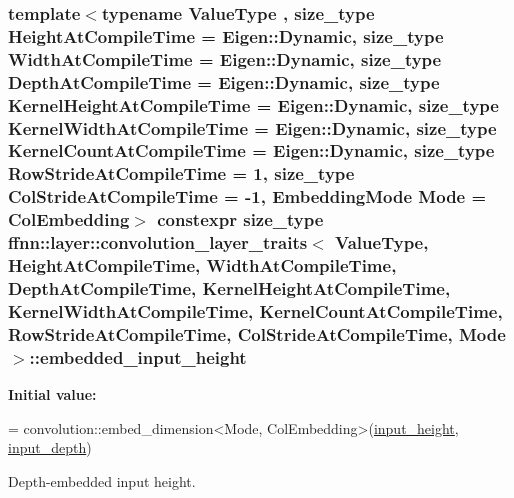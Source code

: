 \hypertarget{structffnn_1_1layer_1_1convolution__layer__traits_a749c38192fa7552eb5cd5ebc4b564592}{
\subsubsection[{embedded\-\_\-input\-\_\-height}]{\setlength{\rightskip}{0pt plus 5cm}template$<$typename Value\-Type , size\-\_\-type Height\-At\-Compile\-Time = Eigen\-::\-Dynamic, size\-\_\-type Width\-At\-Compile\-Time = Eigen\-::\-Dynamic, size\-\_\-type Depth\-At\-Compile\-Time = Eigen\-::\-Dynamic, size\-\_\-type Kernel\-Height\-At\-Compile\-Time = Eigen\-::\-Dynamic, size\-\_\-type Kernel\-Width\-At\-Compile\-Time = Eigen\-::\-Dynamic, size\-\_\-type Kernel\-Count\-At\-Compile\-Time = Eigen\-::\-Dynamic, size\-\_\-type Row\-Stride\-At\-Compile\-Time = 1, size\-\_\-type Col\-Stride\-At\-Compile\-Time = -\/1, Embedding\-Mode Mode = Col\-Embedding$>$ constexpr {\bf size\-\_\-type} {\bf ffnn\-::layer\-::convolution\-\_\-layer\-\_\-traits}$<$ Value\-Type, Height\-At\-Compile\-Time, Width\-At\-Compile\-Time, Depth\-At\-Compile\-Time, Kernel\-Height\-At\-Compile\-Time, Kernel\-Width\-At\-Compile\-Time, Kernel\-Count\-At\-Compile\-Time, Row\-Stride\-At\-Compile\-Time, Col\-Stride\-At\-Compile\-Time, Mode $>$\-::embedded\-\_\-input\-\_\-height\hspace{0.3cm}{\ttfamily [static]}}}\label{structffnn_1_1layer_1_1convolution__layer__traits_a749c38192fa7552eb5cd5ebc4b564592}
{\bfseries Initial value\-:}
\begin{DoxyCode}
=
    convolution::embed\_dimension<Mode, ColEmbedding>(\hyperlink{structffnn_1_1layer_1_1convolution__layer__traits_a94cdb215d2fa97936542f44551bea669}{input\_height}, 
      \hyperlink{structffnn_1_1layer_1_1convolution__layer__traits_a508a1594a6f77f6f536744cd40e2b9fd}{input\_depth})
\end{DoxyCode}


Depth-\/embedded input height. 


